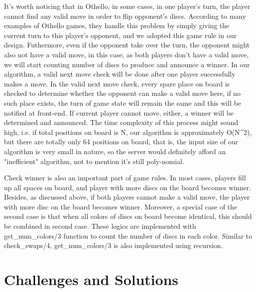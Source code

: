 It's worth noticing that in Othello, in some cases, in one player's turn, the player cannot find any valid move in order to flip opponent's discs. According to many examples of Othello games, they handle this problem by simply giving the current turn to this player's opponent, and we adopted this game rule in our design. Futhermore, even if the opponent take over the turn, the opponent might also not have a valid move, in this case, as both players don't have a valid move, we will start counting number of discs to produce and announce a winner. In our algorithm, a valid next move check will be done after one player successfully makes a move. In the valid next move check, every spare place on board is checked to determine whether the opponent can make a valid move here, if no such place exists, the turn of game state will remain the same and this will be notified at front-end. If current player cannot move, either, a winner will be determined and announced. The time complexity of this process might sound high, i.e. if total positions on board is N, our algorithm is approximately O(N^2), but there are totally only 64 positions on board, that is, the input size of our algorithm is very small in nature, so the server would definitely afford an "inefficient" algorithm, not to mention it's still poly-nomial.

Check winner is also an important part of game rules. In most cases, players fill up all spaces on board, and player with more discs on the board becomes winner. Besides, as discussed above, if both players cannot make a valid move, the player with more disc on the board becomes winner. Moreover, a special case of the second case is that when all colors of discs on board become identical, this should be combined in second case. These logics are implemented with get_num_colors/3 function to count the number of discs in each color. Similar to check_swaps/4, get_num_colors/3 is also implemented using recursion.


\section{Challenges and Solutions}




